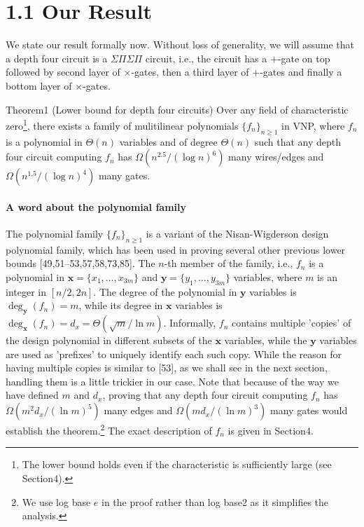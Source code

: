 \section*{1.1 Our Result}
We state our result formally now. Without loss of generality, we will assume that a depth four circuit is a $\Sigma\Pi\Sigma\Pi$ circuit, i.e., the circuit has a $+$-gate on top followed by second layer of $\times$-gates, then a third layer of $+$-gates and finally a bottom layer of $\times$-gates.
\begin{authorclaim}{Theorem1 (Lower bound for depth four circuits)}
Over any field of characteristic zero\footnote{The lower bound holds even if the characteristic is sufficiently large (see Section4).}, there exists a family of mulitilinear polynomials $\{f_n\}_{n\ge1}$ in VNP, where $f_n$ is a polynomial in $\Theta(n)$ variables and of degree $\Theta(n)$ such that any depth four circuit computing $f_n$ has $\Omega(n^{2.5}/(\log n)^6)$ many wires/edges and $\Omega(n^{1.5}/(\log n)^4)$ many gates.
\end{authorclaim}
\paragraph{A word about the polynomial family}
The polynomial family $\{f_n\}_{n\ge1}$ is a variant of the Nisan-Wigderson design polynomial family, which has been used in proving several other previous lower bounds [49,51–53,57,58,73,85]. The $n$-th member of the family, i.e., $f_n$ is a polynomial in $\mathbf x=\{x_1,\ldots,x_{3m}\}$ and $\mathbf y=\{y_1,\ldots,y_{3m}\}$ variables, where $m$ is an integer in $[n/2,2n]$. The degree of the polynomial in $\mathbf y$ variables is $\deg_{\mathbf y}(f_n)=m$, while its degree in $\mathbf x$ variables is $\deg_{\mathbf x}(f_n)=d_x=\Theta(\sqrt m/\ln m)$. Informally, $f_n$ contains multiple 'copies' of the design polynomial in different subsets of the $\mathbf x$ variables, while the $\mathbf y$ variables are used as 'prefixes' to uniquely identify each such copy. While the reason for having multiple copies is similar to [53], as we shall see in the next section, handling them is a little trickier in our case. Note that because of the way we have defined $m$ and $d_x$, proving that any depth four circuit computing $f_n$ has $\Omega(m^2d_x/(\ln m)^5)$ many edges and $\Omega(md_x/(\ln m)^3)$ many gates would establish the theorem.\footnote{We use log base $e$ in the proof rather than log base2 as it simplifies the analysis.} The exact description of $f_n$ is given in Section4.
